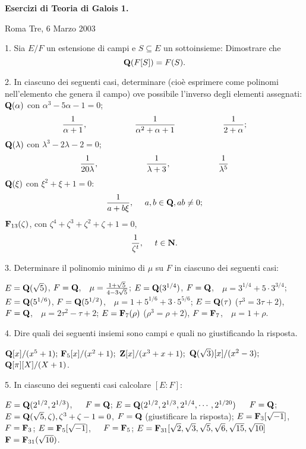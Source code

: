 \def\frac#1#2{{#1\over#2}}
\def\Q{{\bf Q}}
\def\Z{{\bf Z}}
\def\N{{\bf N}}
\def\F{{\bf F}}
\def\QQ{{\rm Q}}


\centerline{{\bf Esercizi di Teoria di Galois 1.}}\medskip

\centerline{Roma Tre, 6 Marzo 2003}\bigskip

\item{1.} Sia $E/F$ un estensione di campi e $S\subseteq E$ un
sottoinsieme: Dimostrare che
$$\Q(F[S])=F(S).$$\bigskip

\item{2.} In ciascuno dei seguenti casi, determinare (cio\`{e} esprimere come polinomi
nell'elemento che genera il campo) ove possibile l'inverso
degli elementi assegnati:
 $\Q(\alpha)$ con $\alpha^3-5\alpha-1=0$;
$$\frac1{\alpha+1},\hskip 2cm\frac1{\alpha^2+\alpha+1}\hskip 2cm \frac1{2+\alpha};$$
 $\Q(\lambda)$ con $\lambda^3-2\lambda-2=0$;
$$\frac1{20\lambda},\hskip 2cm\frac1{\lambda+3},\hskip 2cm \frac 1{\lambda^5}$$
 $\Q(\xi)$ con $\xi^2+\xi+1=0$:
$$\frac1{a+b\xi},\ \ \ \ a,b\in\Q, ab\neq0;$$
 $\F_{13}(\zeta)$, con $\zeta^4+\zeta^3+\zeta^2+\zeta+1=0$,
$$\frac1{\zeta^t},\ \ \ \ t\in\N.$$
\bigskip


\item{3.} Determinare il polinomio minimo di $\mu$ su $F$ in ciascuno dei seguenti casi:

 $E=\Q(\sqrt{5})$, $F=\Q$,\ \hfill \ $\mu=\frac{1+\sqrt{5}}{4-3\sqrt{5}}$;\smallskip
{} $E=\Q(3^{1/4})$, $F=\Q$,\ \hfill \ $\mu=3^{1/4}+5\cdot3^{3/4}$;\smallskip
{} $E=\Q(5^{1/6})$, $F=\Q(5^{1/2})$,\ \hfill \ $\mu=1+5^{1/6}+3\cdot5^{5/6}$;\smallskip
{} $E=\Q(\tau)$ ($\tau^3=3\tau+2$), $F=\Q$,\ \hfill \ $\mu=2\tau^2-\tau+2$;\smallskip
{} $E=\F_{7}(\rho)$ ($\rho^3=\rho+2$), $F=\F_7$,\ \hfill \ $\mu=1+\rho$.
\bigskip

\item{4.} Dire quali dei seguenti insiemi sono campi e quali no giustificando la risposta.

 $\Q[x]/(x^5+1);$\smallskip
{} $\F_5[x]/(x^2+1);$\smallskip
{} $\Z[x]/(x^3+x+1);$\smallskip
{} $\Q(\sqrt{3})[x]/(x^2-3);$\smallskip
{} $\Q[\pi][X]/(X+1)$.
\bigskip

\item{5.} In ciascuno dei seguenti casi calcolare $[E:F]$:

 $E=\Q(2^{1/2},2^{1/3})$,\ \ \  $F=\Q$;\smallskip
{} $E=\Q(2^{1/2},2^{1/3},2^{1/4},\cdots,2^{1/20})$\ \ \  $F=\Q$;\smallskip
{} $E=\Q(\sqrt{5},\zeta), \zeta^3+\zeta-1=0$, $F=\Q$ (giustificare la risposta);\smallskip
{} $E=\F_3[\sqrt{-1}]$,\ \ \ $F=\F_3$;\smallskip
{} $E=\F_5[\sqrt{-1}]$,\ \ \ $F=\F_5$;\smallskip
{} $E=\F_{31}[\sqrt{2},\sqrt{3},\sqrt{5},\sqrt{6},\sqrt{15},\sqrt{10}]$\ \ \ $\F=\F_{31}(\sqrt{10})$.
\bigskip

